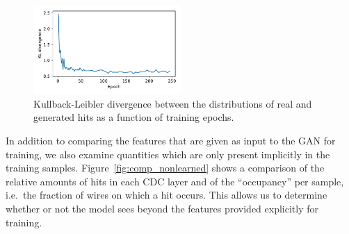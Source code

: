 \begin{figure}
    \centering
    \includegraphics[width=0.5\textwidth]{chapter4/job_21175015_kldiv.pdf}
    \caption{Kullback-Leibler divergence between the distributions of real and generated hits as a function of training epochs.}
    \label{fig:kl_div}
\end{figure}

In addition to comparing the features that are given as input to the GAN for
training, we also examine quantities which are only present implicitly in the
training samples. Figure~\ref{fig:comp_nonlearned} shows a
comparison of the relative amounts of hits in each CDC layer and of the
``occupancy'' per sample, i.e.\ the fraction of wires on which a hit occurs.
This allows us to determine whether or not the model sees beyond the features
provided explicitly for training.

